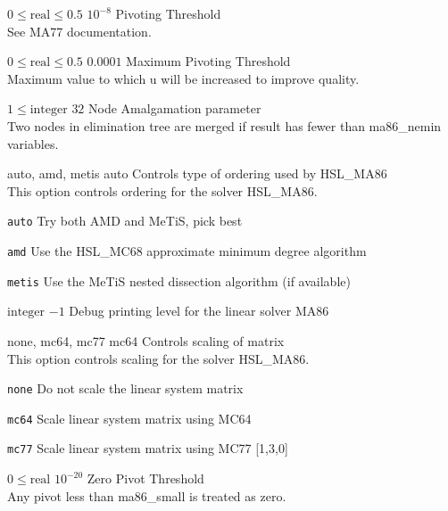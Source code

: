 %
{$0\leq\textrm{real}\leq0.5$}%
{$10^{- 8}$}%
{Pivoting Threshold\\
See MA77 documentation.}%
{}

%
{$0\leq\textrm{real}\leq0.5$}%
{$0.0001$}%
{Maximum Pivoting Threshold\\
Maximum value to which u will be increased to improve quality.}%
{}

%
{$1\leq\textrm{integer}$}%
{$32$}%
{Node Amalgamation parameter\\
Two nodes in elimination tree are merged if result has fewer than ma86\_nemin variables.}%
{}

%
{\ttfamily auto, amd, metis}%
{auto}%
{Controls type of ordering used by HSL\_MA86\\
This option controls ordering for the solver HSL\_MA86.}%
{\begin{list}{}{
\setlength{\parsep}{0em}
\setlength{\leftmargin}{5ex}
\setlength{\labelwidth}{2ex}
\setlength{\itemindent}{0ex}
\setlength{\topsep}{0pt}}
\item[\texttt{auto}] Try both AMD and MeTiS, pick best
\item[\texttt{amd}] Use the HSL\_MC68 approximate minimum degree algorithm
\item[\texttt{metis}] Use the MeTiS nested dissection algorithm (if available)
\end{list}
}

%
{$\textrm{integer}$}%
{$-1$}%
{Debug printing level for the linear solver MA86}%
{}

%
{\ttfamily none, mc64, mc77}%
{mc64}%
{Controls scaling of matrix\\
This option controls scaling for the solver HSL\_MA86.}%
{\begin{list}{}{
\setlength{\parsep}{0em}
\setlength{\leftmargin}{5ex}
\setlength{\labelwidth}{2ex}
\setlength{\itemindent}{0ex}
\setlength{\topsep}{0pt}}
\item[\texttt{none}] Do not scale the linear system matrix
\item[\texttt{mc64}] Scale linear system matrix using MC64
\item[\texttt{mc77}] Scale linear system matrix using MC77 [1,3,0]
\end{list}
}

%
{$0\leq\textrm{real}$}%
{$10^{-20}$}%
{Zero Pivot Threshold\\
Any pivot less than ma86\_small is treated as zero.}%
{}

